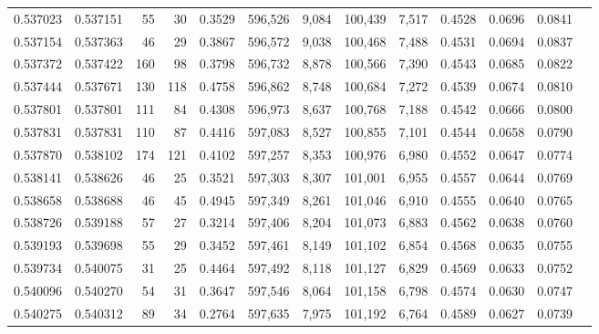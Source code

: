 \begin{tabular}{rrrrrrrrrrrrr}
0.537023 & 0.537151 &    55 &    30 &                                     0.3529 & 596,526 &   9,084 & 100,439 &   7,517 & 0.4528 & 0.0696 & 0.0841 \\
0.537154 & 0.537363 &    46 &    29 &                                     0.3867 & 596,572 &   9,038 & 100,468 &   7,488 & 0.4531 & 0.0694 & 0.0837 \\
0.537372 & 0.537422 &   160 &    98 &                                     0.3798 & 596,732 &   8,878 & 100,566 &   7,390 & 0.4543 & 0.0685 & 0.0822 \\
0.537444 & 0.537671 &   130 &   118 &                                     0.4758 & 596,862 &   8,748 & 100,684 &   7,272 & 0.4539 & 0.0674 & 0.0810 \\
0.537801 & 0.537801 &   111 &    84 &                                     0.4308 & 596,973 &   8,637 & 100,768 &   7,188 & 0.4542 & 0.0666 & 0.0800 \\
0.537831 & 0.537831 &   110 &    87 &                                     0.4416 & 597,083 &   8,527 & 100,855 &   7,101 & 0.4544 & 0.0658 & 0.0790 \\
0.537870 & 0.538102 &   174 &   121 &                                     0.4102 & 597,257 &   8,353 & 100,976 &   6,980 & 0.4552 & 0.0647 & 0.0774 \\
0.538141 & 0.538626 &    46 &    25 &                                     0.3521 & 597,303 &   8,307 & 101,001 &   6,955 & 0.4557 & 0.0644 & 0.0769 \\
0.538658 & 0.538688 &    46 &    45 &                                     0.4945 & 597,349 &   8,261 & 101,046 &   6,910 & 0.4555 & 0.0640 & 0.0765 \\
0.538726 & 0.539188 &    57 &    27 &                                     0.3214 & 597,406 &   8,204 & 101,073 &   6,883 & 0.4562 & 0.0638 & 0.0760 \\
0.539193 & 0.539698 &    55 &    29 &                                     0.3452 & 597,461 &   8,149 & 101,102 &   6,854 & 0.4568 & 0.0635 & 0.0755 \\
0.539734 & 0.540075 &    31 &    25 &                                     0.4464 & 597,492 &   8,118 & 101,127 &   6,829 & 0.4569 & 0.0633 & 0.0752 \\
0.540096 & 0.540270 &    54 &    31 &                                     0.3647 & 597,546 &   8,064 & 101,158 &   6,798 & 0.4574 & 0.0630 & 0.0747 \\
0.540275 & 0.540312 &    89 &    34 &                                     0.2764 & 597,635 &   7,975 & 101,192 &   6,764 & 0.4589 & 0.0627 & 0.0739 \\

\end{tabular}
